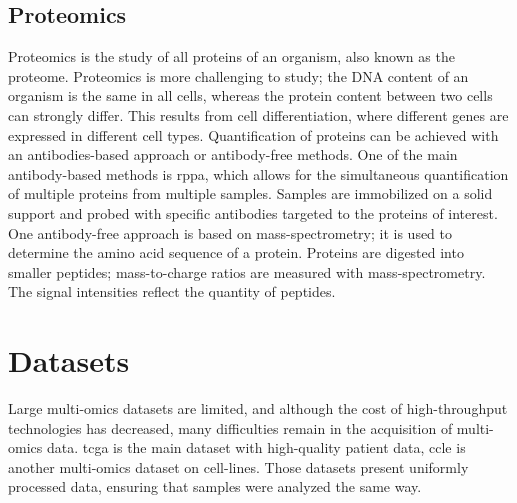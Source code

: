 \documentclass[../main.tex]{subfiles}
\begin{document}
 \subsection{Proteomics}\label{subsec:proteomics}
	 Proteomics is the study of all proteins of an organism, also known as the proteome.
	 Proteomics is more challenging to study; the DNA content of an organism is the same in all cells, whereas the protein content between two cells can strongly differ.
	 This results from cell differentiation, where different genes are expressed in different cell types.
	 Quantification of proteins can be achieved with an antibodies-based approach or antibody-free methods.
	 One of the main antibody-based methods is \gls{rppa}, which allows for the simultaneous quantification of multiple proteins from multiple samples.
	 Samples are immobilized on a solid support and probed with specific antibodies targeted to the proteins of interest.
	 One antibody-free approach is based on mass-spectrometry; it is used to determine the amino acid sequence of a protein.
	 Proteins are digested into smaller peptides; mass-to-charge ratios are measured with mass-spectrometry.
	 The signal intensities reflect the quantity of peptides.

\section{Datasets}
 Large multi-omics datasets are limited, and although the cost of high-throughput technologies has decreased, many difficulties remain in the acquisition of multi-omics data.
 \Gls{tcga} is the main dataset with high-quality patient data, \gls{ccle} is another multi-omics dataset on cell-lines.
 Those datasets present uniformly processed data, ensuring that samples were analyzed the same way.
\end{document}
